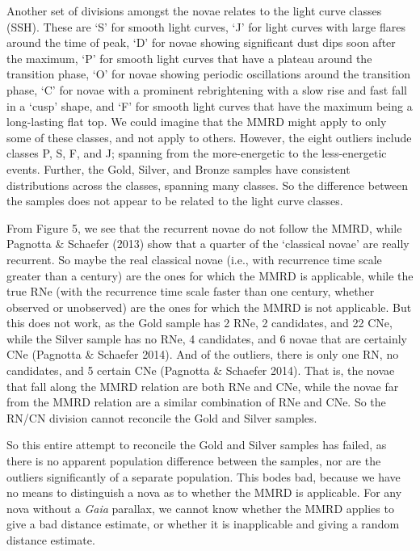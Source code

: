 \documentclass[a4paper,fleqn,usenatbib]{mnras}
\begin{document}
	Another set of divisions amongst the novae relates to the light curve classes (SSH).  These are `S' for smooth light curves, `J' for light curves with large flares around the time of peak, `D' for novae showing significant dust dips soon after the maximum, `P' for smooth light curves that have a plateau around the transition phase, `O' for novae showing periodic oscillations around the transition phase, `C' for novae with a prominent rebrightening with a slow rise and fast fall in a `cusp' shape, and `F' for smooth light curves that have the maximum being a long-lasting flat top.  We could imagine that the MMRD might apply to only some of these classes, and not apply to others.  However, the eight outliers include classes P, S, F, and J; spanning from the more-energetic to the less-energetic events.  Further, the Gold, Silver, and Bronze samples have consistent distributions across the classes, spanning many classes.  So the difference between the samples does not appear to be related to the light curve classes.
	
	From Figure 5, we see that the recurrent novae do not follow the MMRD, while Pagnotta \& Schaefer (2013) show that a quarter of the `classical novae' are really recurrent.  So maybe the real classical novae (i.e., with recurrence time scale greater than a century) are the ones for which the MMRD is applicable, while the true RNe (with the recurrence time scale faster than one century, whether observed or unobserved) are the ones for which the MMRD is not applicable.  But this does not work, as the Gold sample has 2 RNe, 2 candidates, and 22 CNe, while the Silver sample has no RNe, 4 candidates, and 6 novae that are certainly CNe (Pagnotta \& Schaefer 2014).  And of the outliers, there is only one RN, no candidates, and 5 certain CNe (Pagnotta \& Schaefer 2014).  That is, the novae that fall along the MMRD relation are both RNe and CNe, while the novae far from the MMRD relation are a similar combination of RNe and CNe.  So the RN/CN division cannot reconcile the Gold and Silver samples.
	
	So this entire attempt to reconcile the Gold and Silver samples has failed, as there is no apparent population difference between the samples, nor are the outliers significantly of a separate population.  This bodes bad, because we have no means to distinguish a nova as to whether the MMRD is applicable.  For any nova without a {\it Gaia} parallax, we cannot know whether the MMRD applies to give a bad distance estimate, or whether it is inapplicable and giving a random distance estimate.
\end{document}
